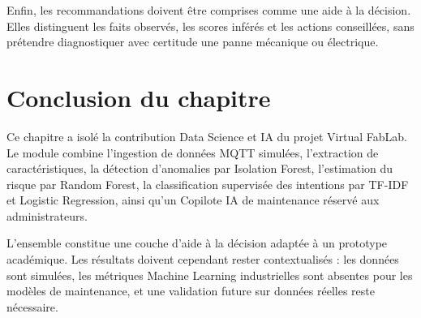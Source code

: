 Enfin, les recommandations doivent être comprises comme une aide à la décision. Elles distinguent les faits observés, les scores inférés et les actions conseillées, sans prétendre diagnostiquer avec certitude une panne mécanique ou électrique.

\section{Conclusion du chapitre}

Ce chapitre a isolé la contribution Data Science et IA du projet Virtual FabLab. Le module combine l'ingestion de données MQTT simulées, l'extraction de caractéristiques, la détection d'anomalies par Isolation Forest, l'estimation du risque par Random Forest, la classification supervisée des intentions par TF-IDF et Logistic Regression, ainsi qu'un Copilote IA de maintenance réservé aux administrateurs.

L'ensemble constitue une couche d'aide à la décision adaptée à un prototype académique. Les résultats doivent cependant rester contextualisés : les données sont simulées, les métriques Machine Learning industrielles sont absentes pour les modèles de maintenance, et une validation future sur données réelles reste nécessaire.
